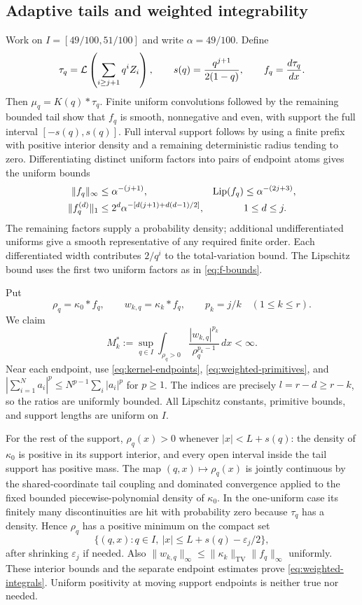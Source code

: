 \documentclass[11pt,letterpaper]{article}
\theoremstyle{remark}\newtheorem{remark}[theorem]{Remark}
\newcommand{\Lip}{\operatorname{Lip}}
\newcommand{\TV}{\operatorname{TV}}
\begin{document}
\subsection{Adaptive tails and weighted integrability}
Work on $I=[49/100,51/100]$ and write $\alpha=49/100$. Define
\[
\tau_q=\mathcal L\left(\sum_{i\ge j+1}q^iZ_i\right),\qquad
s(q)=\frac{q^{j+1}}{2(1-q)},\qquad f_q=\frac{d\tau_q}{dx}.
\]
Then $\mu_q=K(q)*\tau_q$. Finite uniform convolutions followed by the remaining bounded tail show that $f_q$ is smooth, nonnegative and even, with support the full interval $[-s(q),s(q)]$. Full interval support follows by using a finite prefix with positive interior density and a remaining deterministic radius tending to zero. Differentiating distinct uniform factors into pairs of endpoint atoms gives the uniform bounds
\begin{align}
\|f_q\|_\infty&\le\alpha^{-(j+1)},&
\Lip(f_q)&\le\alpha^{-(2j+3)},\label{eq:tail-bounds}\\
\|f_q^{(d)}\|_1&\le 2^d\alpha^{-[d(j+1)+d(d-1)/2]},
&&1\le d\le j.\notag
\end{align}
The remaining factors supply a probability density; additional undifferentiated uniforms give a smooth representative of any required finite order. Each differentiated width contributes $2/q^i$ to the total-variation bound. The Lipschitz bound uses the first two uniform factors as in \eqref{eq:f-bounds}.

Put
\[
\rho_q=\kappa_0*f_q,\qquad w_{k,q}=\kappa_k*f_q,\qquad p_k=j/k\quad(1\le k\le r).
\]
We claim
\begin{equation}\label{eq:weighted-integrals}
M_k^*:=\sup_{q\in I}\int_{\rho_q>0}
       \frac{|w_{k,q}|^{p_k}}{\rho_q^{p_k-1}}\,dx<\infty.
\end{equation}
Near each endpoint, use \eqref{eq:kernel-endpoints}, \eqref{eq:weighted-primitives}, and
$|\sum_{i=1}^N a_i|^p\le N^{p-1}\sum_i|a_i|^p$ for $p\ge1$.
The indices are precisely $l=r-d\ge r-k$, so the ratios are uniformly bounded. All Lipschitz constants, primitive bounds, and support lengths are uniform on $I$.

For the rest of the support, $\rho_q(x)>0$ whenever $|x|<L+s(q)$: the density of $\kappa_0$ is positive in its support interior, and every open interval inside the tail support has positive mass. The map $(q,x)\mapsto\rho_q(x)$ is jointly continuous by the shared-coordinate tail coupling and dominated convergence applied to the fixed bounded piecewise-polynomial density of $\kappa_0$. In the one-uniform case its finitely many discontinuities are hit with probability zero because $\tau_q$ has a density. Hence $\rho_q$ has a positive minimum on the compact set
\[
\{(q,x):q\in I,\ |x|\le L+s(q)-\varepsilon_j/2\},
\]
after shrinking $\varepsilon_j$ if needed. Also
$\|w_{k,q}\|_\infty\le\|\kappa_k\|_{\TV}\|f_q\|_\infty$ uniformly. These interior bounds and the separate endpoint estimates prove \eqref{eq:weighted-integrals}. Uniform positivity at moving support endpoints is neither true nor needed.
\end{document}
